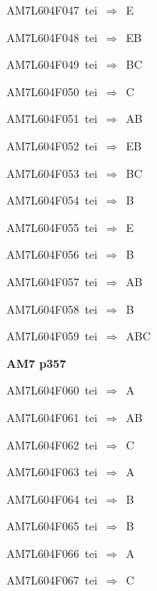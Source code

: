 {\sixrm AM7L604F047\ {\sixit tei}\ }$\Rightarrow$\ E\par\smallskip
{\sixrm AM7L604F048\ {\sixit tei}\ }$\Rightarrow$\ EB\par\smallskip
{\sixrm AM7L604F049\ {\sixit tei}\ }$\Rightarrow$\ BC\par\smallskip
{\sixrm AM7L604F050\ {\sixit tei}\ }$\Rightarrow$\ C\par\smallskip
{\sixrm AM7L604F051\ {\sixit tei}\ }$\Rightarrow$\ AB\par\smallskip
{\sixrm AM7L604F052\ {\sixit tei}\ }$\Rightarrow$\ EB\par\smallskip
{\sixrm AM7L604F053\ {\sixit tei}\ }$\Rightarrow$\ BC\par\smallskip
{\sixrm AM7L604F054\ {\sixit tei}\ }$\Rightarrow$\ B\par\smallskip
{\sixrm AM7L604F055\ {\sixit tei}\ }$\Rightarrow$\ E\par\smallskip
{\sixrm AM7L604F056\ {\sixit tei}\ }$\Rightarrow$\ B\par\smallskip
{\sixrm AM7L604F057\ {\sixit tei}\ }$\Rightarrow$\ AB\par\smallskip
{\sixrm AM7L604F058\ {\sixit tei}\ }$\Rightarrow$\ B\par\smallskip
{\sixrm AM7L604F059\ {\sixit tei}\ }$\Rightarrow$\ ABC\par\smallskip

\par\vfill\eject
{\bf\hfill AM7 p357\hfill\hbox{}}\par\bigskip
{\sixrm AM7L604F060\ {\sixit tei}\ }$\Rightarrow$\ A\par\smallskip
{\sixrm AM7L604F061\ {\sixit tei}\ }$\Rightarrow$\ AB\par\smallskip
{\sixrm AM7L604F062\ {\sixit tei}\ }$\Rightarrow$\ C\par\smallskip
{\sixrm AM7L604F063\ {\sixit tei}\ }$\Rightarrow$\ A\par\smallskip
{\sixrm AM7L604F064\ {\sixit tei}\ }$\Rightarrow$\ B\par\smallskip
{\sixrm AM7L604F065\ {\sixit tei}\ }$\Rightarrow$\ B\par\smallskip
{\sixrm AM7L604F066\ {\sixit tei}\ }$\Rightarrow$\ A\par\smallskip
{\sixrm AM7L604F067\ {\sixit tei}\ }$\Rightarrow$\ C\par\smallskip

